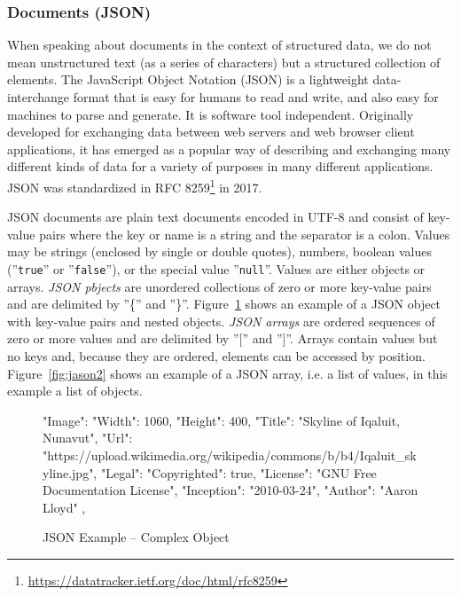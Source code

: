 \subsubsection*{Documents (JSON)}

When speaking about documents in the context of structured data, we do not mean unstructured text (as a series of characters) but a structured collection of elements. The JavaScript Object Notation (JSON) is a lightweight data-interchange format that is easy for humans to read and write, and also easy for machines to parse and generate. It is software tool independent. Originally developed for exchanging data between web servers and web browser client applications, it has emerged as a popular way of describing and exchanging many different kinds of data for a variety of purposes in many different applications. JSON was standardized in RFC 8259\footnote{\url{https://datatracker.ietf.org/doc/html/rfc8259}} in 2017.

JSON documents are plain text documents encoded in UTF-8 and consist of key-value pairs where the key or name is a string and the separator is a colon. Values may be strings (enclosed by single or double quotes), numbers, boolean values (''\texttt{true}'' or ''\texttt{false}''), or the special value ''\texttt{null}''. Values are either objects or arrays. \emph{JSON pbjects} are unordered collections of zero or more key-value pairs and are delimited by ''\{'' and ''\}''. Figure~\ref{fig:json1} shows an example of a JSON object with key-value pairs and nested objects. \emph{JSON arrays} are ordered sequences of zero or more values and are delimited by ''['' and '']''. Arrays contain values but no keys and, because they are ordered, elements can be accessed by position. Figure~\ref{fig:jason2} shows an example of a JSON array, i.e. a list of values, in this example a list of objects.

\begin{figure}[h]
\begin{jsoncode}
{
  "Image": {
    "Width": 1060,
    "Height": 400,
    "Title": "Skyline of Iqaluit, Nunavut",
    "Url": 
"https://upload.wikimedia.org/wikipedia/commons/b/b4/Iqaluit_skyline.jpg",
    "Legal": {
      "Copyrighted": true,
      "License": "GNU Free Documentation License",
      "Inception": "2010-03-24",
      "Author": "Aaron Lloyd"
     },
  }
}
\end{jsoncode}
\caption{JSON Example -- Complex Object}
\label{fig:json1}
\end{figure}

